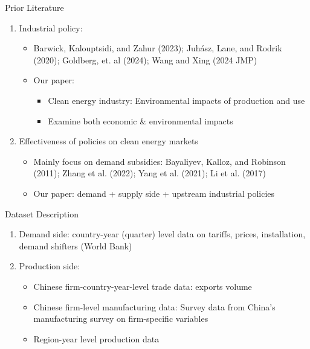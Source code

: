 \documentclass[xcolor=dvipsnames,envcountsect]{beamer}
\begin{document}
\begin{frame}{Prior Literature}
    \begin{enumerate}
        \item Industrial policy: 
        \begin{itemize} 
        \item Barwick, Kalouptsidi, and Zahur (2023); Juhász, Lane, and Rodrik  (2020); Goldberg, et. al (2024); Wang and Xing (2024 JMP)
        \item Our paper: 
            \begin{itemize} 
              \item Clean energy industry: Environmental impacts of production and use 
              \item Examine both economic \& environmental impacts
            \end{itemize}
        \end{itemize}
        \pause
        \item Effectiveness of policies on clean energy markets
        \begin{itemize} 
        \item Mainly focus on demand subsidies: Bayaliyev, Kalloz, and Robinson (2011);  Zhang et al. (2022); Yang et al. (2021); Li et al. (2017)
        \item Our paper: demand + supply side + upstream industrial policies
        \end{itemize}
    \end{enumerate}
\end{frame}



\begin{frame}[label=Data]{Dataset Description}
\begin{enumerate}
    \item Demand side: country-year (quarter) level data on tariffs, prices, installation, demand shifters (World Bank)
    \item Production side:
    \begin{itemize}
        \item Chinese firm-country-year-level trade data: exports volume
        \item Chinese firm-level manufacturing data: Survey data from China's manufacturing survey on firm-specific variables
        \item Region-year level production data
    \end{itemize}

\end{enumerate}
\end{frame}
\end{document}
